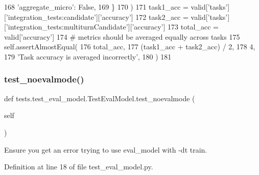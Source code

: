 \begin{DoxyCode}
168                 \textcolor{stringliteral}{'aggregate\_micro'}: \textcolor{keyword}{False},
169             \}
170         )
171         task1\_acc = valid[\textcolor{stringliteral}{'tasks'}][\textcolor{stringliteral}{'integration\_tests:candidate'}][\textcolor{stringliteral}{'accuracy'}]
172         task2\_acc = valid[\textcolor{stringliteral}{'tasks'}][\textcolor{stringliteral}{'integration\_tests:multiturnCandidate'}][\textcolor{stringliteral}{'accuracy'}]
173         total\_acc = valid[\textcolor{stringliteral}{'accuracy'}]
174         \textcolor{comment}{# metrics should be averaged equally across tasks}
175         self.assertAlmostEqual(
176             total\_acc,
177             (task1\_acc + task2\_acc) / 2,
178             4,
179             \textcolor{stringliteral}{'Task accuracy is averaged incorrectly'},
180         )
181 
\end{DoxyCode}
\mbox{\label{classtests_1_1test__eval__model_1_1TestEvalModel_a9dcbb770a097fa51f6162fe85c8cd1c5}} 
\subsubsection{\texorpdfstring{test\+\_\+noevalmode()}{test\_noevalmode()}}
{\footnotesize\ttfamily def tests.\+test\+\_\+eval\+\_\+model.\+Test\+Eval\+Model.\+test\+\_\+noevalmode (\begin{DoxyParamCaption}\item[{}]{self }\end{DoxyParamCaption})}

\begin{DoxyVerb}Ensure you get an error trying to use eval_model with -dt train.
\end{DoxyVerb}
 

Definition at line 18 of file test\+\_\+eval\+\_\+model.\+py.


